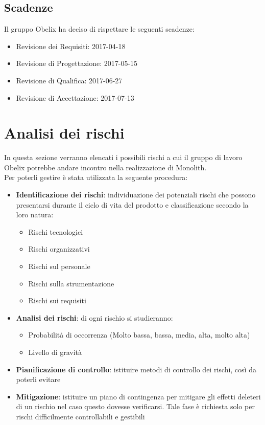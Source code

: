 \subsection{Scadenze}

Il gruppo Obelix ha deciso di rispettare le seguenti scadenze:

\begin{itemize}

\item Revisione dei Requisiti: 2017-04-18
\item Revisione di Progettazione: 2017-05-15
\item Revisione di Qualifica: 2017-06-27
\item Revisione di Accettazione: 2017-07-13

\end{itemize}

\section{Analisi dei rischi}
In questa sezione verranno elencati i possibili rischi a cui il gruppo di lavoro Obelix potrebbe andare incontro nella realizzazione di Monolith.\\Per poterli gestire è stata utilizzata la seguente procedura:
\begin{itemize}
\item \textbf{Identificazione dei rischi}: individuazione dei potenziali rischi che possono presentarsi durante il ciclo di vita del prodotto e classificazione secondo la loro natura:
  \begin{itemize}
  \item Rischi tecnologici\item Rischi organizzativi\item Rischi sul personale\item Rischi sulla strumentazione\item Rischi sui requisiti
  \end{itemize}

\item \textbf{Analisi dei rischi}: di ogni rischio si studieranno:
  \begin{itemize}
  \item Probabilità di occorrenza (Molto bassa, bassa, media, alta, molto alta)\item Livello di gravità
  \end{itemize}

\item \textbf{Pianificazione di controllo}: istituire metodi di controllo dei  rischi, così da poterli evitare
\item \textbf{Mitigazione}: istituire un piano di contingenza per
  mitigare gli effetti deleteri di un rischio nel caso questo
  dovesse verificarsi. Tale fase è richiesta solo per rischi
  difficilmente controllabili e gestibili
\end{itemize}

